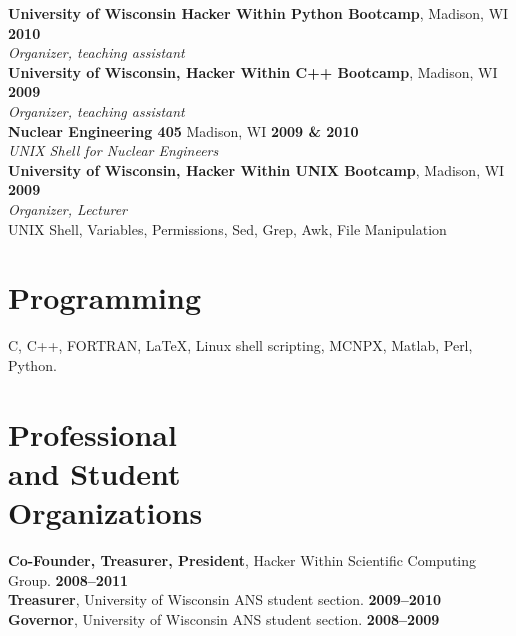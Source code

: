 \documentclass[margin,line]{resume}
\begin{document}
\begin{resume}
    \textbf{University of Wisconsin Hacker Within Python Bootcamp}, Madison, WI \hfill \textbf{2010}\\
               \textsl{Organizer, teaching assistant}\\
    \textbf{University of Wisconsin, Hacker Within C++ Bootcamp}, Madison, WI \hfill \textbf{2009}\\
               \textsl{Organizer, teaching assistant}\\
    \textbf{Nuclear Engineering 405} Madison, WI \hfill \textbf{2009 \& 2010}\\ 
               \textsl{UNIX Shell for Nuclear Engineers}\\
    \textbf{University of Wisconsin, Hacker Within UNIX Bootcamp}, Madison, WI \hfill \textbf{2009}\\
               \textsl{Organizer, Lecturer}\\
               UNIX Shell, Variables, Permissions, Sed, Grep, Awk, File Manipulation\\

    \section{\mysidestyle Programming} 
		C, C++, FORTRAN, \LaTeX, Linux shell scripting, MCNPX, Matlab, Perl, Python.\vspace{1mm}

		\vspace{-2mm}
    \section{\mysidestyle Professional\\and Student\\Organizations} 
		\textbf{Co-Founder, Treasurer, President}, Hacker Within Scientific Computing Group. \hfill \textbf{2008--2011}\vspace{.5mm}\\%
		\textbf{Treasurer}, University of Wisconsin ANS student section. \hfill \textbf{2009--2010}\vspace{.5mm}\\%
		\textbf{Governor}, University of Wisconsin ANS student section. \hfill \textbf{2008--2009}\vspace{.5mm}\\\vspace{-2mm}%


%  
\end{resume}
\end{document}
